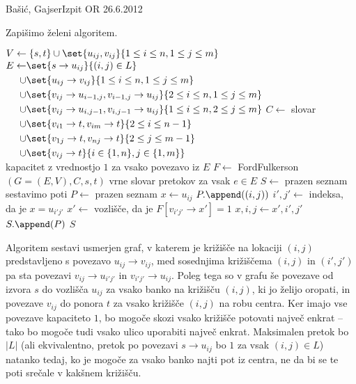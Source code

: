\begin{naloga}{Bašić, Gajser}{Izpit OR 26.6.2012}
\begin{odgovor}
Zapišimo želeni algoritem.
\begin{small}
\begin{algorithmic}
        \State {}
    \EndIf
    \State $V \gets \{s, t\}
              \cup \set{u_{ij}, v_{ij}}{1 \le i \le n, 1 \le j \le m}$
    \State $\begin{aligned}
        E \gets&{} \set{s \to u_{ij}}{(i, j) \in L} \\
           \cup&{} \set{u_{ij} \to v_{ij}}{1 \le i \le n, 1 \le j \le m} \\
           \cup&{} \set{v_{ij} \to u_{i-1, j}, v_{i-1, j} \to u_{ij}}{2 \le i \le n, 1 \le j \le m} \\
           \cup&{} \set{v_{ij} \to u_{i, j-1}, v_{i, j-1} \to u_{ij}}{1 \le i \le n, 2 \le j \le m} \\
           \cup&{} \set{v_{i1} \to t, v_{im} \to t}{2 \le i \le n-1} \\
           \cup&{} \set{v_{1j} \to t, v_{nj} \to t}{2 \le j \le m-1} \\
           \cup&{} \set{v_{ij} \to t}{i \in \{1, n\}, j \in \{1, m\}}
        \end{aligned}$
    \State $C \gets$ slovar kapacitet z vrednostjo $1$ za vsako povezavo iz $E$
    \State $F \gets$ {\sc FordFulkerson}$(G = (E, V), C, s, t)$
        \hfill vrne slovar pretokov za vsak $e \in E$
        \State {}
    \EndIf
    \State $S \gets$ prazen seznam
     \hfill sestavimo poti
        \State $P \gets$ prazen seznam
        \State $x \gets u_{ij}$
            \State $P.\append((i, j))$
            \State $i', j' \gets$ indeksa, da je $x = u_{i'j'}$
            \State $x' \gets$ vozlišče, da je $F[v_{i'j'} \to x'] = 1$
            \State $x, i, j \gets x', i', j'$
        \EndWhile
        \State $S.\append(P)$
    \EndFor
    \State \Return $S$
\EndFunction
\end{algorithmic}
\end{small}
Algoritem sestavi usmerjen graf,
v katerem je križišče na lokaciji $(i, j)$
pred\-stav\-lje\-no s povezavo $u_{ij} \to v_{ij}$,
med sosednjima križiščema $(i, j)$ in $(i', j')$
pa sta povezavi $v_{ij} \to u_{i'j'}$ in $v_{i'j'} \to u_{ij}$.
Poleg tega so v grafu še povezave od izvora $s$ do vozlišča $u_{ij}$
za vsako banko na križišču $(i, j)$,
ki jo želijo oropati,
in povezave $v_{ij}$ do ponora $t$ za vsako križišče $(i, j)$ na robu centra.
Ker imajo vse povezave kapaciteto $1$,
bo mogoče skozi vsako križišče potovati največ enkrat
-- tako bo mogoče tudi vsako ulico uporabiti največ enkrat.
Maksimalen pretok bo $|L|$
(ali ekvivalentno,
pretok po povezavi $s \to u_{ij}$ bo $1$ za vsak $(i, j) \in L$)
natanko tedaj,
ko je mogoče za vsako banko najti pot iz centra,
ne da bi se te poti srečale v kakšnem križišču.
\end{odgovor}
\end{naloga}

